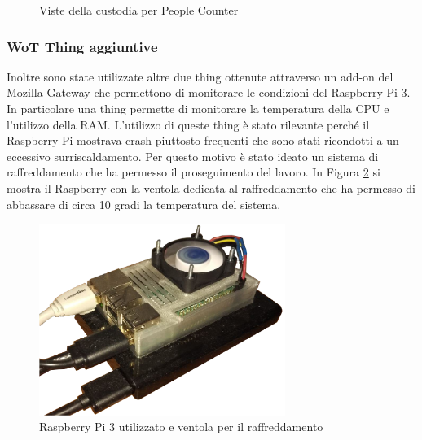 \documentclass{article}
\begin{document}
\begin{figure}%
    \centering
    \qquad
    \caption{Viste della custodia per People Counter}
    \label{fig:viewPC}%
\end{figure}


\subsubsection{WoT Thing aggiuntive}
Inoltre sono state utilizzate altre due thing ottenute attraverso un add-on del Mozilla Gateway che permettono di monitorare le condizioni del Raspberry Pi 3. In particolare una thing permette di monitorare la temperatura della CPU e l'utilizzo della RAM. 
L'utilizzo di queste thing è stato rilevante perché il Raspberry Pi mostrava crash piuttosto frequenti che sono stati ricondotti a un eccessivo surriscaldamento. Per questo motivo è stato ideato un sistema di raffreddamento che ha permesso il proseguimento del lavoro. In Figura \ref{fig:raspberry} si mostra il Raspberry con la ventola dedicata al raffreddamento che ha permesso di abbassare di circa 10 gradi la temperatura del sistema.
\begin{figure}
    \centering
    \includegraphics[width=8cm]{img/raspberry.png}
    \caption{Raspberry Pi 3 utilizzato e ventola per il raffreddamento}
    \label{fig:raspberry}
\end{figure}
\end{document}
